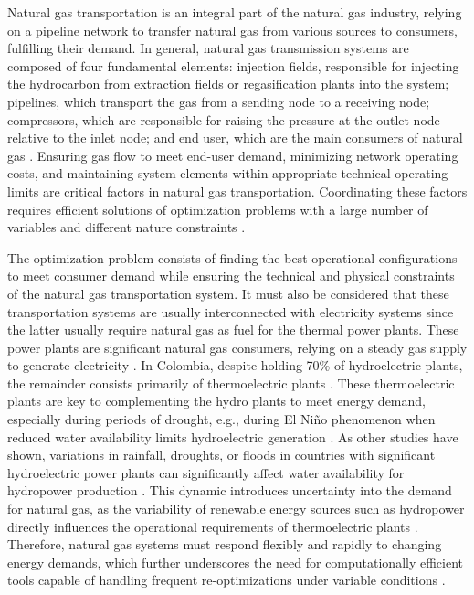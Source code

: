 Natural gas transportation is an integral part of the natural gas industry, relying on a pipeline network to transfer natural gas from various sources to consumers, fulfilling their demand. In general, natural gas transmission systems are composed of four fundamental elements: injection fields, responsible for injecting the hydrocarbon from extraction fields or regasification plants into the system; pipelines, which transport the gas from a sending node to a receiving node; compressors, which are responsible for raising the pressure at the outlet node relative to the inlet node; and end user, which are the main consumers of natural gas \cite{review}. Ensuring gas flow to meet end-user demand, minimizing network operating costs, and maintaining system elements within appropriate technical operating limits are critical factors in natural gas transportation. Coordinating these factors requires efficient solutions of optimization problems with a large number of variables and different nature constraints  \cite{Conejo}.


The optimization problem consists of finding the best operational configurations to meet consumer demand while ensuring the technical and physical constraints of the natural gas transportation system.  It must also be considered that these transportation systems are usually interconnected with electricity systems since the latter usually require natural gas as fuel for the thermal power plants. These power plants are significant natural gas consumers, relying on a steady gas supply to generate electricity \cite{Byeon_Van_Hentenryck_2020}. In Colombia, despite holding 70\% of hydroelectric plants, the remainder consists primarily of thermoelectric plants \cite{Morcillo_Angulo_Franco_2020a}. These thermoelectric plants are key to complementing the hydro plants to meet energy demand, especially during periods of drought, e.g., during El Niño phenomenon when reduced water availability limits hydroelectric generation \cite{droughts_colombia}. As other studies have shown, variations in rainfall, droughts, or floods in countries with significant hydroelectric power plants can significantly affect water availability for hydropower production \cite{Cuartas_Cunha_Alves_Parra_Deusdará_Leal_Costa_Molina_Amore_Broedel_Seluchi_et_al_2022}. This dynamic introduces uncertainty into the demand for natural gas, as the variability of renewable energy sources such as hydropower directly influences the operational requirements of thermoelectric plants \cite{Bessa_Moreira_Silva_Matos_2019}. Therefore, natural gas systems must respond flexibly and rapidly to changing energy demands, which further underscores the need for computationally efficient tools capable of handling frequent re-optimizations under variable conditions \cite{9831787}.

